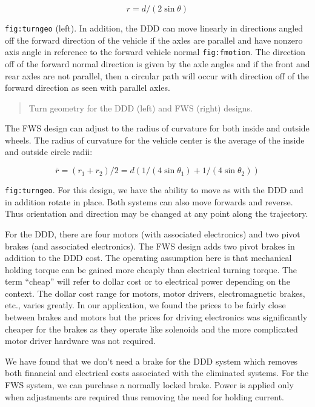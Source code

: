 \[r  = d/(2\sin\theta)\]

\texttt{fig:turngeo} (left). In addition, the DDD can move linearly in
directions angled off the forward direction of the vehicle if the axles
are parallel and have nonzero axis angle in reference to the forward
vehicle normal \texttt{fig:fmotion}. The direction off of the forward
normal direction is given by the axle angles and if the front and rear
axles are not parallel, then a circular path will occur with direction
off of the forward direction as seen with parallel axles.

\begin{quote}
Turn geometry for the DDD (left) and FWS (right) designs.
\end{quote}

The FWS design can adjust to the radius of curvature for both inside and
outside wheels. The radius of curvature for the vehicle center is the
average of the inside and outside circle radii:

\[\overline{r} = (r_1+r_2)/2 = d\left(1/(4\sin\theta_1) + 1/(4\sin\theta_2)\right)\]

\texttt{fig:turngeo}. For this design, we have the ability to move as
with the DDD and in addition rotate in place. Both systems can also move
forwards and reverse. Thus orientation and direction may be changed at
any point along the trajectory.

For the DDD, there are four motors (with associated electronics) and two
pivot brakes (and associated electronics). The FWS design adds two pivot
brakes in addition to the DDD cost. The operating assumption here is
that mechanical holding torque can be gained more cheaply than
electrical turning torque. The term ``cheap'' will refer to dollar cost
or to electrical power depending on the context. The dollar cost range
for motors, motor drivers, electromagnetic brakes, etc., varies greatly.
In our application, we found the prices to be fairly close between
brakes and motors but the prices for driving electronics was
significantly cheaper for the brakes as they operate like solenoids and
the more complicated motor driver hardware was not required.

We have found that we don't need a brake for the DDD system which
removes both financial and electrical costs associated with the
eliminated systems. For the FWS system, we can purchase a normally
locked brake. Power is applied only when adjustments are required thus
removing the need for holding current.
